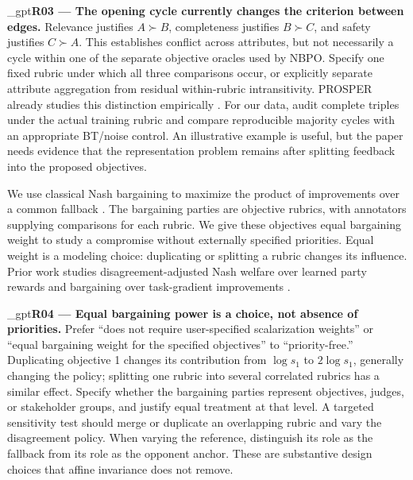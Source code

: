 \documentclass{article}
\makeatletter
\newif\ifshowreviews
\let\revieworiginalref\ref
\newcommand{\reviewref}[1]{%
  \@ifundefined{r@#1}{\textnormal{[original-draft ref.: \texttt{\detokenize{#1}}]}}%
  {\revieworiginalref{#1}}}
\let\ref\reviewref
\newcommand{\reviewresponse}[1]{%
  \ifshowreviews
  \par\begingroup\color{blue!65!black}\hypersetup{allcolors=blue!65!black}\emergencystretch=2em%
  \noindent\textbf{Response:} #1\par\endgroup
  \fi}
\theoremstyle{remark}
\theoremstyle{plain}
\makeatother
\begin{document}
\kekim_gpt{\textbf{R03 --- The opening cycle currently changes the criterion between edges.} Relevance justifies $A\succ B$, completeness justifies $B\succ C$, and safety justifies $C\succ A$. This establishes conflict across attributes, but not necessarily a cycle within one of the separate objective oracles used by NBPO. Specify one fixed rubric under which all three comparisons occur, or explicitly separate attribute aggregation from residual within-rubric intransitivity. PROSPER already studies this distinction empirically \citep{zhang2026prosper}. For our data, audit complete triples under the actual training rubric and compare reproducible majority cycles with an appropriate BT/noise control. An illustrative example is useful, but the paper needs evidence that the representation problem remains after splitting feedback into the proposed objectives.}
\reviewresponse{\textbf{R03 --- Partially addressed.} The hypothetical example uses one helpfulness rubric. UF is now explicitly a score-induced alignment control, separate from the direct-feedback audit and controlled cyclic games. The audit finds no significant repeated-cycle excess or order-robust witness; residual cyclicity in natural training feedback remains unestablished.}


We use classical Nash bargaining to maximize the product of improvements over a common fallback \citep{nash1950}. The bargaining parties are objective rubrics, with annotators supplying comparisons for each rubric. We give these objectives equal bargaining weight to study a compromise without externally specified priorities. Equal weight is a modeling choice: duplicating or splitting a rubric changes its influence. Prior work studies disagreement-adjusted Nash welfare over learned party rewards and bargaining over task-gradient improvements \citep{zhong2024nashwelfare,navon2022nashmtl}.

\kekim_gpt{\textbf{R04 --- Equal bargaining power is a choice, not absence of priorities.} Prefer ``does not require user-specified scalarization weights'' or ``equal bargaining weight for the specified objectives'' to ``priority-free.'' Duplicating objective 1 changes its contribution from $\log s_1$ to $2\log s_1$, generally changing the policy; splitting one rubric into several correlated rubrics has a similar effect. Specify whether the bargaining parties represent objectives, judges, or stakeholder groups, and justify equal treatment at that level. A targeted sensitivity test should merge or duplicate an overlapping rubric and vary the disagreement policy. When varying the reference, distinguish its role as the fallback from its role as the opponent anchor. These are substantive design choices that affine invariance does not remove.}
\reviewresponse{\textbf{R04 --- Partially addressed.} The introduction identifies objective rubrics as bargaining parties, states that equal weight is a modeling choice, and separates the reference's disagreement and opponent-anchor roles. Rubric duplication/merging and separate reference-sensitivity experiments are explicitly pending in Appendix~\ref{app:rubric-reference-sensitivity}.}
\end{document}
